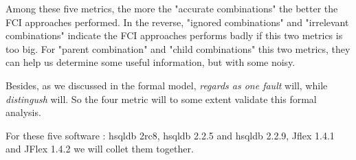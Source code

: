 \documentclass{sig-alternate}
\begin{document}
Among these five metrics, the more the "accurate combinations" the better the FCI approaches performed. In the reverse, "ignored combinations" and "irrelevant combinations" indicate the FCI approaches performs badly if this two metrics is too big. For "parent combination" and "child combinations" this two metrics, they can help us determine some useful information, but with some noisy.

Besides, as we discussed in the formal model, \emph{regards as one fault} will, while \emph{distingush} will. So the four metric will to some extent validate this formal analysis.

For these five software : hsqldb 2rc8, hsqldb 2.2.5 and hsqldb 2.2.9, Jflex 1.4.1 and JFlex 1.4.2 we will collet them together.


%
%
%
%
%
%
%
%
\end{document}
